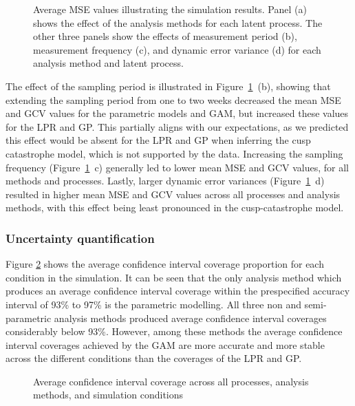 \documentclass[man, floatsintext]{apa7}
\begin{document}
\begin{figure}[!ht]
  \caption{Average MSE values illustrating the simulation results. Panel (a)
    shows the effect of the analysis methods for each latent process. The other
    three panels show the effects of measurement period (b), measurement
    frequency (c), and dynamic error variance (d) for each analysis method and
    latent process.}
  \label{fig:results}
\end{figure}

The effect of the sampling period is illustrated in
Figure~\ref{fig:results}~(b), showing that extending the
sampling period from one to two weeks decreased the mean MSE and GCV values for
the parametric models and GAM, but increased these values for the LPR and
GP\@. This partially aligns with our expectations, as we predicted this effect
would be absent for the LPR and GP when inferring the cusp catastrophe model,
which is not supported by the data. Increasing the sampling frequency
(Figure~\ref{fig:results}~c)
generally led to lower mean MSE and GCV values, for all methods and
processes. Lastly, larger
dynamic error variances (Figure~\ref{fig:results}~d)
resulted in higher mean MSE and GCV values across all
processes and analysis methods, with this effect being least pronounced in the
cusp-catastrophe model.

\subsubsection{Uncertainty quantification}

Figure \ref{fig:ci_plot} shows the average confidence interval coverage
proportion
for each condition in the simulation. It can be seen that the only analysis
method which produces an average confidence interval coverage within
the prespecified accuracy interval of 93\% to 97\% is the parametric modelling.
All three non and semi-parametric analysis methods produced average
confidence interval coverages considerably below 93\%. However, among
these methods the average confidence interval coverages achieved by the GAM
are more accurate and more stable across the different conditions than the
coverages of the LPR and GP.

\begin{figure}[!ht]
  \caption{Average confidence interval coverage across all processes,
    analysis methods, and simulation conditions}
  \label{fig:ci_plot}
\end{figure}
\end{document}
